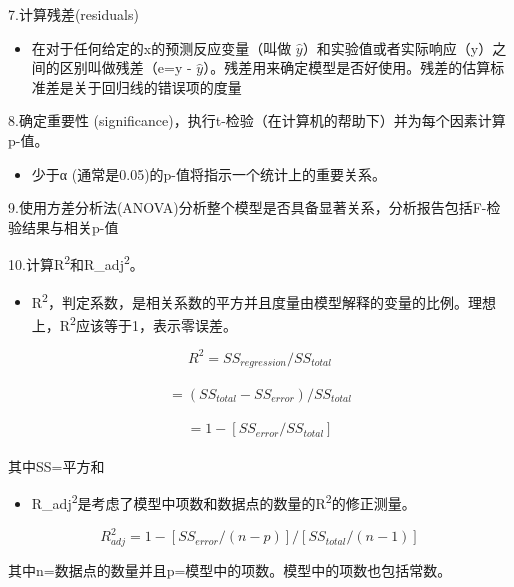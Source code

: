 7.计算残差(residuals)\\


\begin{itemize}
\tightlist
\item
  在对于任何给定的x的预测反应变量（叫做
  \(\hat y\)）和实验值或者实际响应（y）之间的区别叫做残差（e=y -
  \(\hat y\)）。残差用来确定模型是否好使用。残差的估算标准差是关于回归线的错误项的度量
\end{itemize}


8.确定重要性 (significance)，执行t-检验（在计算机的帮助下）并为每个因素计算p-值。\\


\begin{itemize}
\tightlist
\item
  少于α (通常是0.05)的p-值将指示一个统计上的重要关系。
\end{itemize}

9.使用方差分析法(ANOVA)分析整个模型是否具备显著关系，分析报告包括F-检验结果与相关p-值

10.计算R\textsuperscript{2}和R\_adj\textsuperscript{2}。


\begin{itemize}
\tightlist
\item
  R\textsuperscript{2}，判定系数，是相关系数的平方并且度量由模型解释的变量的比例。理想上，R\textsuperscript{2}应该等于1，表示零误差。
\end{itemize}



\[{R}^2 = {SS}_{regression} / {SS}_{total}\]\\
\[= ( {SS}_{total} - {SS}_{error} ) / {SS}_{total}\]\\
\[= 1 - [ {SS}_{error} / {SS}_{total} ]\]\\

其中SS=平方和

\begin{itemize}
\tightlist
\item
  R\_adj\textsuperscript{2}是考虑了模型中项数和数据点的数量的R\textsuperscript{2}的修正测量。
\end{itemize}



\[{R}_{adj}^2 = 1 - [{SS}_{error} / (n - p)] / [{SS}_{total} / (n - 1)]\]

其中n=数据点的数量并且p=模型中的项数。模型中的项数也包括常数。

